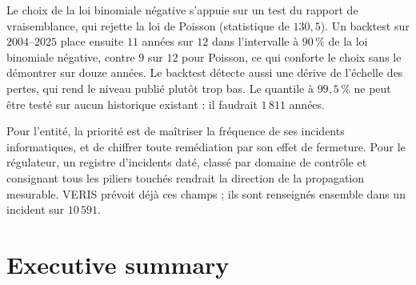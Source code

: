 Le choix de la loi binomiale négative s'appuie sur un test du rapport de vraisemblance, qui rejette
la loi de Poisson (statistique de $130{,}5$). Un backtest sur $2004$--$2025$ place ensuite $11$
années sur $12$ dans l'intervalle à $90\,\%$ de la loi binomiale négative, contre $9$ sur $12$ pour
Poisson, ce qui conforte le choix sans le démontrer sur douze années. Le backtest détecte aussi une dérive de l'échelle des pertes, qui rend le niveau publié plutôt trop bas. Le quantile à $99{,}5\,\%$ ne peut être testé sur aucun historique existant : il faudrait $1\,811$ années.

Pour l'entité, la priorité est de maîtriser la fréquence de ses incidents informatiques, et de chiffrer toute remédiation par son effet de fermeture. Pour le
régulateur, un registre d'incidents daté, classé par domaine de contrôle et consignant tous les
piliers touchés rendrait la direction de la propagation mesurable. VERIS prévoit déjà ces champs ; ils sont renseignés ensemble dans un incident sur $10\,591$.


\chapter*{Executive summary}


